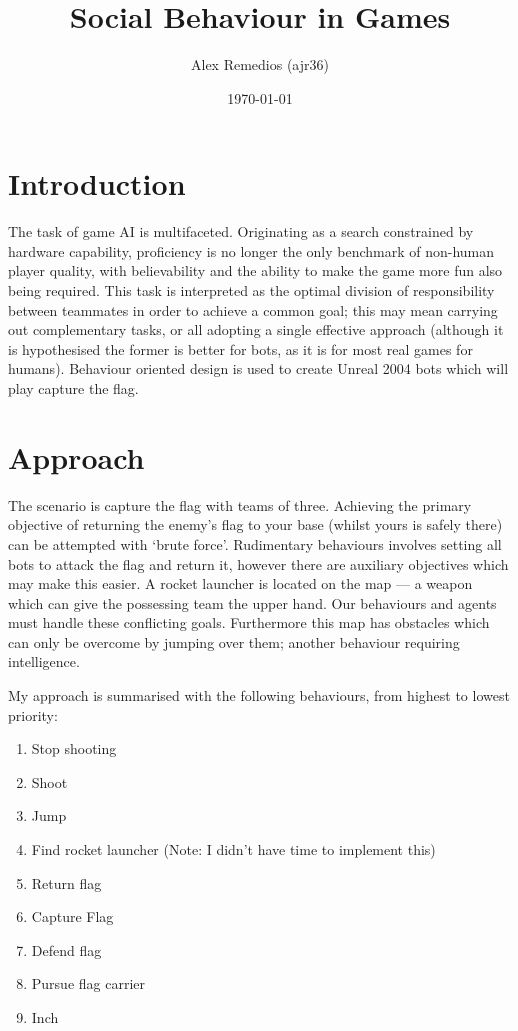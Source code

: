 \documentclass[a4paper,12pt]{article}
\title{Social Behaviour in Games}
\author{Alex Remedios (ajr36)}
\date{\today}
\begin{document}
\maketitle

\section{Introduction}
The task of game AI is multifaceted. Originating as a search constrained by hardware capability, proficiency is no longer the only benchmark of non-human player quality, with believability and the ability to make the game more fun also being required. This task is interpreted as the optimal division of responsibility between teammates in order to achieve a common goal; this may mean carrying out complementary tasks, or all adopting a single effective approach (although it is hypothesised the former is better for bots, as it is for most real games for humans). Behaviour oriented design is used to create Unreal 2004 bots which will play capture the flag.

\section{Approach}
The scenario is capture the flag with teams of three. Achieving the primary objective of returning the enemy's flag to your base (whilst yours is safely there) can be attempted with `brute force'. Rudimentary behaviours involves setting all bots to attack the flag and return it, however there are auxiliary objectives which may make this easier. A rocket launcher is located on the map --- a weapon which can give the possessing team the upper hand. Our behaviours and agents must handle these conflicting goals. Furthermore this map has obstacles which can only be overcome by jumping over them; another behaviour requiring intelligence.

My approach is summarised with the following behaviours, from highest to lowest priority:
\begin{enumerate}
\item Stop shooting
\item Shoot
\item Jump
\item Find rocket launcher (Note: I didn't have time to implement this)
\item Return flag
\item Capture Flag
\item Defend flag
\item Pursue flag carrier
\item Inch
\end{enumerate}
\end{document}
